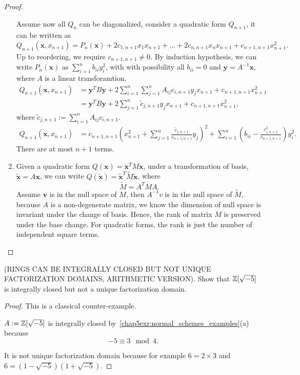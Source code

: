 \begin{proof}
\begin{enumerate}[label=(\alph*)]
Assume now all $Q_n$ can be diagonalized, consider a quadratic form $Q_{n+1}$, it can be written as 
$$
Q_{n+1}(\mathbf{x},x_{n+1})=P_{n}(\mathbf{x})+2c_{1,n+1}x_1x_{n+1}+...+2c_{n,n+1}x_nx_{n+1}+c_{n+1,n+1}x_{n+1}^2.
$$
Up to reordering, we require $c_{n+1,n+1}\neq 0$.
By induction hypothesis, we can write $P_n(\mathbf{x})$ as $\sum_{i=1}^n b_{ii}y_i^2$, with with possibility all $b_{ii}=0$ and $\mathbf{y}=A^{-1}\mathbf{x}$, where $A$ is a linear transforamtion.
$$
\begin{aligned}
Q_{n+1}(\mathbf{x},x_{n+1})&=\mathbf{y}^{T}B\mathbf{y}+2\sum_{i=1}^n\sum_{j=1}^n A_{ij}c_{i,n+1}y_jx_{n+1}+c_{n+1,n+1}x_{n+1}^2\\
&=\mathbf{y}^{T}B\mathbf{y}+2\sum_{j=1}^n \tilde{c}_{j,n+1}y_jx_{n+1}+c_{n+1,n+1}x_{n+1}^2,
\end{aligned}
$$ 
where $\tilde{c}_{j,n+1}:=\sum_{i=1}^nA_{ij} c_{i,n+1}$.
$$
\begin{aligned}
Q_{n+1}(\mathbf{x},x_{n+1})
&=c_{n+1,n+1}\left(x_{n+1}^2+\sum_{j=1}^n\frac{\tilde{c}_{j,n+1}}{c_{n+1,n+1}}y_j\right)^2+\sum_{i=1}^n\left(b_{ii}-\frac{c_{j,n+1}^2}{c_{n+1,n+1}}\right) y_i^2.
\end{aligned}
$$ 
There are at most $n+1$ terms.
\item Given a quadratic form $Q(\mathbf{x})=\mathbf{x}^{T}M\mathbf{x}$, under a transformation of basis, $\tilde{\mathbf{x}}=A \mathbf{x}$, we can write $Q(\tilde{\mathbf{x}})=\tilde{\mathbf{x}}^T \tilde{M} \tilde{\mathbf{x}}$, where 
$$
\tilde{M}=A^{T}M A.
$$
Assume $\mathbf{v}$ is in the null space of $M$, then $A^{-1}v$ is  in the null space of $\tilde{M}$, because $A$ is a non-degenerate matrix, we know the dimension of  null space is invariant under the change of basis. Hence, the rank of matrix $M$ is preserved under the base change. For quadratic forms, the rank is just the number of independent square terms.
\end{enumerate}
\end{proof}

\begin{exr}
(RINGS CAN BE INTEGRALLY CLOSED BUT NOT UNIQUE FACTORIZATION DOMAINS, ARITHMETIC VERSION). Show that $\mathbb Z[\sqrt{-5}]$ is integrally closed but not a unique factorization domain.
\end{exr}
\begin{proof}
This is a classical counter-example.

 $A:=\mathbb Z[\sqrt{-5}]$ is integrally closed by~\ref{chap5exr:normal_schemes_examples}(a) because 
 $$-5\equiv 3\mod 4.
 $$

 It is not unique factorization domain because for example $6=2\times 3$ and $6=(1-\sqrt{-5})(1+\sqrt{-5})$.
\end{proof}


